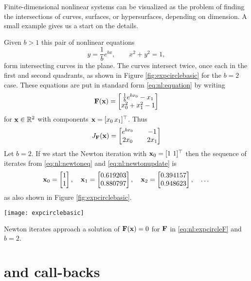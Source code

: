 Finite-dimensional nonlinear systems can be visualized as the problem of finding the intersections of curves, surfaces, or hypersurfaces, depending on dimension.  A small example gives us a start on the details.

\medskip\noindent\hrulefill
\begin{example}  Given $b > 1$ this pair of nonlinear equations
    $$y = \frac{1}{b} e^{bx}, \qquad x^2+y^2 = 1,$$
form intersecting curves in the plane.  The curves intersect twice, once each in the first and second quadrants, as shown in Figure \ref{fig:expcirclebasic} for the $b=2$ case.  These equations are put in standard form \eqref{eq:nl:equation} by writing
\begin{equation}
\label{eq:nl:expcircleF}
\mathbf{F}(\mathbf{x}) = \begin{bmatrix}
           \frac{1}{b} e^{b x_0} - x_1 \\
           x_0^2 + x_1^2 - 1
           \end{bmatrix}
\end{equation}
for $\mathbf{x}\in \mathbb{R}^2$ with components $\mathbf{x} = [x_0 \, x_1]^\top$.  Thus
\begin{equation}
\label{eq:nl:expcircleJac}
J_{\mathbf{F}}(\mathbf{x}) = \begin{bmatrix}
    e^{b x_0} & & -1 \\
    2 x_0   & & 2 x_1 \end{bmatrix}
\end{equation}
Let $b=2$.  If we start the Newton iteration with $\mathbf{x}_0 = [1 \,\, 1]^\top$ then the sequence of iterates from \eqref{eq:nl:newtoneq} and \eqref{eq:nl:newtonupdate} is
    $${\mathbf{x}}_{0} = \begin{bmatrix} 1 \\ 1 \end{bmatrix}, \quad {\mathbf{x}}_{1} = \begin{bmatrix} 0.619203 \\ 0.880797 \end{bmatrix}, \quad {\mathbf{x}}_{2} = \begin{bmatrix} 0.394157 \\ 0.948623 \end{bmatrix}, \quad \dots$$
as also shown in Figure \ref{fig:expcirclebasic}.

\begin{marginfigure}
\texttt{[image: expcirclebasic]}
\caption{Newton iterates approach a solution of $\mathbf{F}(\mathbf{x})=0$ for $\mathbf{F}$ in \eqref{eq:nl:expcircleF} and $b=2$.}
\label{fig:expcirclebasic}
\end{marginfigure}

\noindent\hrulefill
\end{example}


\section{\pSNES and call-backs}


